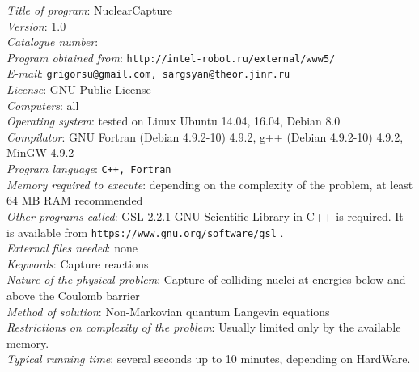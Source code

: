 \documentclass[preprint,review,12pt]{elsarticle}
\begin{document}
\begin{small}
  \noindent
  {\em Title of program\/}: NuclearCapture \\
  {\em Version\/}: 1.0 \\
  {\em Catalogue number\/}: \\
  {\em Program obtained from\/}: {\tt http://intel-robot.ru/external/www5/} \\
  {\em E-mail\/}: {\tt grigorsu@gmail.com, sargsyan@theor.jinr.ru} \\
  {\em License\/}: GNU Public License \\
  {\em Computers\/}: all \\
  {\em Operating system\/}: tested on Linux Ubuntu 14.04, 16.04,  Debian 8.0  \\
  {\em Compilator\/}: GNU Fortran (Debian 4.9.2-10) 4.9.2, g++ (Debian 4.9.2-10) 4.9.2, MinGW 4.9.2  \\
  {\em Program language\/}: {\tt C++, Fortran    } \\
  {\em Memory required to execute\/}:
       depending on the complexity of the problem,
       at least 64 MB RAM recommended   \\
  {\em Other programs called\/}: GSL-2.2.1 GNU Scientific Library in C++ is required.
       It is available from  {\tt https://www.gnu.org/software/gsl} .\\
  {\em External files needed\/}: none \\
  {\em Keywords\/}:  Capture reactions \\
  {\em Nature of the physical problem\/}:
  Capture of colliding nuclei at energies below and above the Coulomb barrier \\
  {\em Method of solution\/}:
  Non-Markovian quantum Langevin equations \\
  {\em Restrictions on complexity of the problem\/}:
  Usually limited only by the available memory. \\
  {\em Typical running time\/}: several seconds up to 10 minutes, depending on HardWare.


\end{small}
\end{document}
